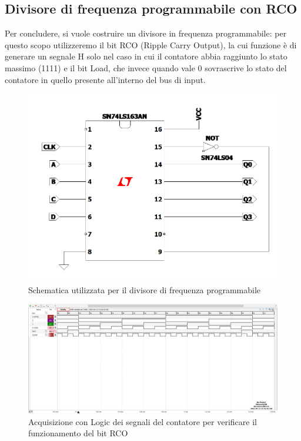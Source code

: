 \documentclass[10pt, a4paper, italian]{article}
\begin{document}
\subsection{Divisore di frequenza programmabile con RCO}
Per concludere, si vuole costruire un divisore in frequenza programmabile:
per questo scopo utilizzeremo il bit RCO (Ripple Carry Output), la cui funzione è di generare un segnale H solo nel caso in cui il contatore abbia raggiunto lo stato massimo (1111) e il bit Load, che invece quando vale 0 sovrascrive lo stato del contatore in quello presente all'interno del bus di input. 
\begin{figure}[htbp]
\centering
	\includegraphics[width=\textwidth]{Draft2}
	\caption{Schematica utilizzata per il divisore di frequenza programmabile}
\end{figure}
\begin{figure}[htbp]
\centering
	\includegraphics[width=\textwidth]{5.RCO}
	\caption{Acquisizione con Logic dei segnali del contatore per verificare il funzionamento del bit RCO}
\end{figure}
\end{document}
